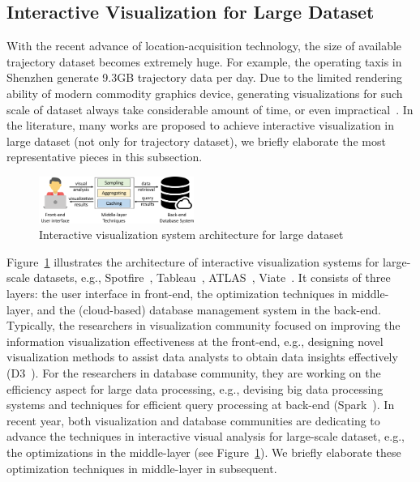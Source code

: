 \subsection{Interactive Visualization for Large Dataset}\label{sec:interactive}

With the recent advance of location-acquisition technology, the size of available trajectory dataset becomes extremely huge.
For example, the operating taxis in Shenzhen generate 9.3GB trajectory data per day.
Due to the limited rendering ability of modern commodity graphics device, generating visualizations for such scale of dataset always take considerable amount of time,
or even impractical~\cite{park2016visualization}.
In the literature, many works are proposed to achieve interactive visualization in large dataset (not only for trajectory dataset), we briefly elaborate the most representative pieces in this subsection.

\begin{figure}
	\centering
	\includegraphics[width=0.45\textwidth]{pictures/framework/framework.pdf}
	\caption{Interactive visualization system architecture for large dataset} \label{fig:framework}
    \vspace{-4mm}
\end{figure}

Figure~\ref{fig:framework} illustrates the architecture of interactive visualization systems for large-scale datasets,
e.g., Spotfire~\cite{Spotfire}, Tableau~\cite{Tableau}, ATLAS~\cite{chan2008maintaining}, Viate~\cite{yang2019vaite}.
It consists of three layers: the user interface in front-end, the optimization techniques in middle-layer, and the (cloud-based) database management system in the back-end.
Typically, the researchers in visualization community focused on improving the information visualization effectiveness at the front-end,
e.g., designing novel visualization methods to assist data analysts to obtain data insights effectively (D3~\cite{d3}).
For the researchers in database community, they are working on the efficiency aspect for large data processing,
e.g., devising big data processing systems and techniques for efficient query processing at back-end (Spark~\cite{spark}).
In recent year, both visualization and database communities are dedicating to advance the techniques in interactive visual analysis for large-scale dataset,
e.g., the optimizations in the middle-layer (see Figure~\ref{fig:framework}).
We briefly elaborate these optimization techniques in middle-layer in subsequent. %

